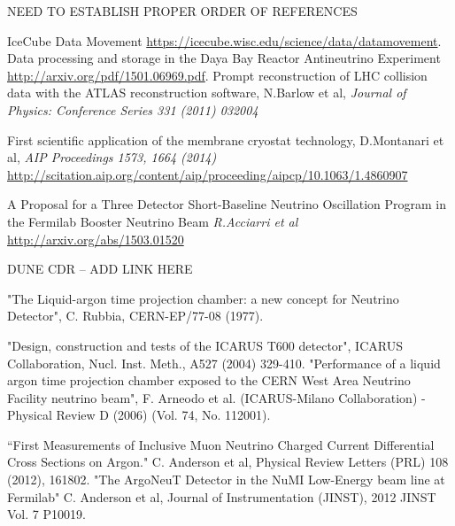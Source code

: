 \begin{thebibliography}{99}

 {\color{red} NEED TO ESTABLISH PROPER ORDER OF REFERENCES}

 IceCube Data Movement \url{https://icecube.wisc.edu/science/data/datamovement}.
Data processing and storage in the Daya Bay Reactor Antineutrino Experiment \url{http://arxiv.org/pdf/1501.06969.pdf}.
 Prompt reconstruction of LHC collision data with the ATLAS reconstruction software, N.Barlow et al, \textit{Journal of Physics: Conference Series 331 (2011) 032004}

 First scientific application of the membrane cryostat technology, D.Montanari et al, \textit{AIP Proceedings 1573, 1664 (2014)} \url{http://scitation.aip.org/content/aip/proceeding/aipcp/10.1063/1.4860907}

  A Proposal for a Three Detector Short-Baseline Neutrino Oscillation Program in the Fermilab Booster Neutrino Beam \textit{R.Acciarri et al} \url{http://arxiv.org/abs/1503.01520}
 

 DUNE CDR -- ADD LINK HERE

"The Liquid-argon time projection chamber: a new concept for Neutrino Detector", C. Rubbia, CERN-EP/77-08 (1977).


 "Design, construction and tests of the ICARUS T600 detector", ICARUS Collaboration, Nucl. Inst. Meth., A527 (2004) 329-410. 
"Performance of a liquid argon time projection chamber exposed to the CERN West Area Neutrino Facility neutrino beam", F. Arneodo et al. (ICARUS-Milano Collaboration) - Physical Review D (2006) (Vol. 74, No. 112001). 

 ``First Measurements of Inclusive Muon Neutrino Charged Current Differential Cross Sections on Argon." C. Anderson et al, Physical Review Letters (PRL) 108 (2012), 161802. 
 "The ArgoNeuT Detector in the NuMI Low-Energy beam line at Fermilab" C. Anderson et al, Journal of Instrumentation (JINST), 2012 JINST Vol. 7 P10019. 


\end{thebibliography}
